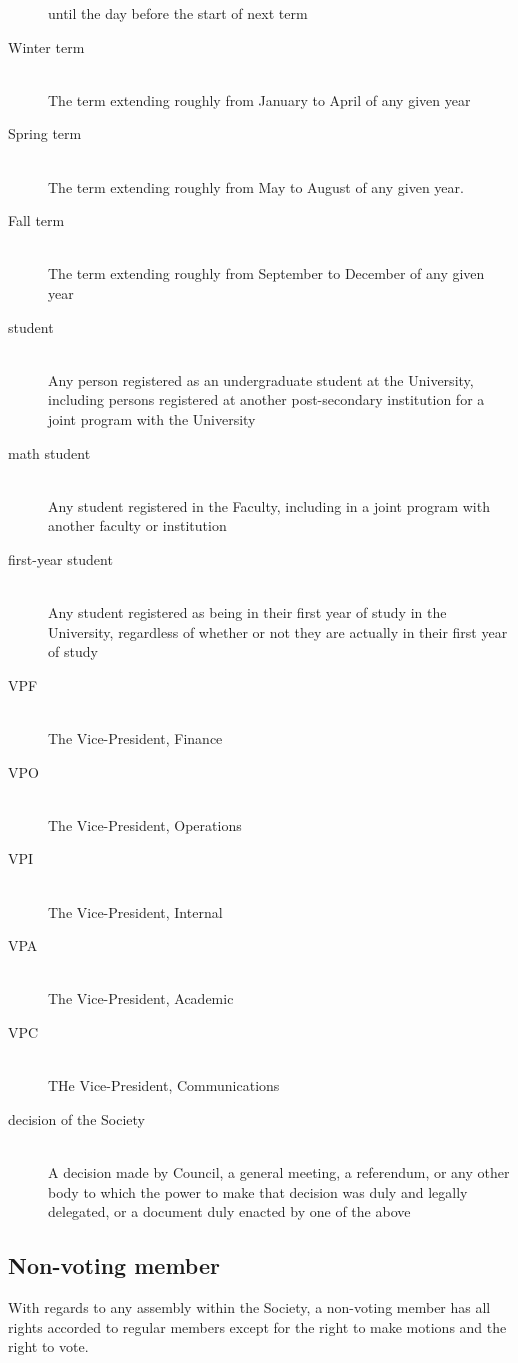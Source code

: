 \begin{description}
  until the day before the start of next term
\item[Winter term]\hfill\\
  The term extending roughly from January to April of any given year
\item[Spring term]\hfill\\
  The term extending roughly from May to August of any given year.
\item[Fall term]\hfill\\
  The term extending roughly from September to December of any given year
\item[student]\hfill\\
  Any person registered as an undergraduate student at the University, including
  persons registered at another post-secondary institution for a joint program
  with the University
\item[math student]\hfill\\
  Any student registered in the Faculty, including in a joint program with
  another faculty or institution
\item[first-year student]\hfill\\
  Any student registered as being in their first year of study in the
  University, regardless of whether or not they are actually in their first year
  of study
\item[VPF]\hfill\\
  The Vice-President, Finance
\item[VPO]\hfill\\
  The Vice-President, Operations
\item[VPI]\hfill\\
  The Vice-President, Internal
\item[VPA]\hfill\\
  The Vice-President, Academic
\item[VPC]\hfill\\
  THe Vice-President, Communications
\item[decision of the Society]\hfill\\
  A decision made by Council, a general meeting, a referendum, or any other body
  to which the power to make that decision was duly and legally delegated, or a
  document duly enacted by one of the above
\end{description}

\subsection{Non-voting member}
With regards to any assembly within the Society, a non-voting member has all
rights accorded to regular members except for the right to make motions and
the right to vote.

